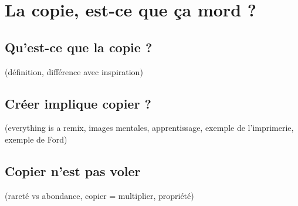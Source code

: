 \chapter{La copie, est-ce que ça mord ?}

\section{Qu'est-ce que la copie ?}
(définition, différence avec inspiration)
\section{Créer implique copier ?}
(everything is a remix, images mentales, apprentissage, exemple de l'imprimerie, exemple de Ford)
\section{Copier n'est pas voler}
(rareté vs abondance, copier = multiplier, propriété)
